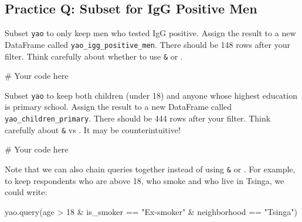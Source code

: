\documentclass[
  letterpaper,
  DIV=11,
  numbers=noendperiod]{scrreprt}
\newenvironment{Shaded}{\begin{snugshade}}{\end{snugshade}}
\newcommand{\CommentTok}[1]{\textcolor[rgb]{0.37,0.37,0.37}{#1}}
\newcommand{\NormalTok}[1]{\textcolor[rgb]{0.00,0.23,0.31}{#1}}
\newcommand{\StringTok}[1]{\textcolor[rgb]{0.13,0.47,0.30}{#1}}
\begin{document}
\begin{tcolorbox}[enhanced jigsaw, colframe=quarto-callout-tip-color-frame, opacityback=0, titlerule=0mm, bottomrule=.15mm, breakable, leftrule=.75mm, colbacktitle=quarto-callout-tip-color!10!white, title=\textcolor{quarto-callout-tip-color}{\faLightbulb}\hspace{0.5em}{Practice}, rightrule=.15mm, coltitle=black, opacitybacktitle=0.6, colback=white, left=2mm, arc=.35mm, toptitle=1mm, bottomtitle=1mm, toprule=.15mm]

\subsection{Practice Q: Subset for IgG Positive
Men}\label{practice-q-subset-for-igg-positive-men}

Subset \texttt{yao} to only keep men who tested IgG positive. Assign the
result to a new DataFrame called \texttt{yao\_igg\_positive\_men}. There
should be 148 rows after your filter. Think carefully about whether to
use \texttt{\&} or \texttt{\textbar{}}.

\begin{Shaded}
\begin{Highlighting}[]
\CommentTok{\# Your code here}
\end{Highlighting}
\end{Shaded}

Subset \texttt{yao} to keep both children (under 18) and anyone whose
highest education is primary school. Assign the result to a new
DataFrame called \texttt{yao\_children\_primary}. There should be 444
rows after your filter. Think carefully about \texttt{\&} vs
\texttt{\textbar{}}. It may be counterintuitive!

\begin{Shaded}
\begin{Highlighting}[]
\CommentTok{\# Your code here}
\end{Highlighting}
\end{Shaded}

\end{tcolorbox}

Note that we can also chain queries together instead of using
\texttt{\&} or \texttt{\textbar{}}. For example, to keep respondents who
are above 18, who smoke and who live in Tsinga, we could write:

\begin{Shaded}
\begin{Highlighting}[]
\NormalTok{yao.query(}\StringTok{\textquotesingle{}age \textgreater{} 18 \& is\_smoker == "Ex{-}smoker" \& neighborhood == "Tsinga"\textquotesingle{}}\NormalTok{)}
\end{Highlighting}
\end{Shaded}
\end{document}

